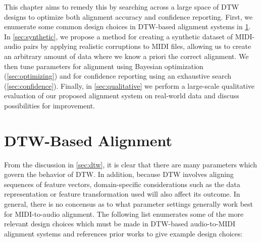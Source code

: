This chapter aims to remedy this by searching across a large space of DTW designs to optimize both alignment accuracy and confidence reporting.
First, we enumerate some common design choices in DTW-based alignment systems in \cref{sec:dtw_parameters}.
In \cref{sec:synthetic}, we propose a method for creating a synthetic dataset of MIDI-audio pairs by applying realistic corruptions to MIDI files, allowing us to create an arbitrary amount of data where we know a priori the correct alignment.
We then tune parameters for alignment using Bayesian optimization (\cref{sec:optimizing}) and for confidence reporting using an exhaustive search (\cref{sec:confidence}).
Finally, in \cref{sec:qualitative} we perform a large-scale qualitative evaluation of our proposed alignment system on real-world data and discuss possibilities for improvement.

\section{DTW-Based Alignment}
\label{sec:dtw_parameters}

From the discussion in \cref{sec:dtw}, it is clear that there are many parameters which govern the behavior of DTW.
In addition, because DTW involves aligning sequences of feature vectors, domain-specific considerations such as the data representation or feature transformation used will also affect its outcome.
In general, there is no concensus as to what parameter settings generally work best for MIDI-to-audio alignment.
The following list enumerates some of the more relevant design choices which must be made in DTW-based audio-to-MIDI alignment systems and references prior works to give example design choices:

